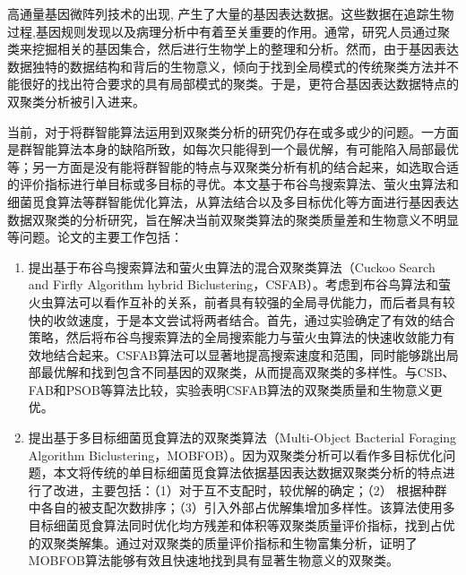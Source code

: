 \begin{cabstract}
  高通量基因微阵列技术的出现, 产生了大量的基因表达数据。这些数据在追踪生物过程,基因规则发现以及病理分析中有着至关重要的作用。通常，研究人员通过聚类来挖掘相关的基因集合，然后进行生物学上的整理和分析。然而，由于基因表达数据独特的数据结构和背后的生物意义，倾向于找到全局模式的传统聚类方法并不能很好的找出符合要求的具有局部模式的聚类。于是，更符合基因表达数据特点的双聚类分析被引入进来。
  
  当前，对于将群智能算法运用到双聚类分析的研究仍存在或多或少的问题。一方面是群智能算法本身的缺陷所致，如每次只能得到一个最优解，有可能陷入局部最优等；另一方面是没有能将群智能的特点与双聚类分析有机的结合起来，如选取合适的评价指标进行单目标或多目标的寻优。本文基于布谷鸟搜索算法、萤火虫算法和细菌觅食算法等群智能优化算法，从算法结合以及多目标优化等方面进行基因表达数据双聚类的分析研究，旨在解决当前双聚类算法的聚类质量差和生物意义不明显等问题。论文的主要工作包括：

  \begin{enumerate}
    \item 提出基于布谷鸟搜索算法和萤火虫算法的混合双聚类算法（Cuckoo Search and Firfly Algorithm hybrid Biclustering，CSFAB）。考虑到布谷鸟算法和萤火虫算法可以看作互补的关系，前者具有较强的全局寻优能力，而后者具有较快的收敛速度，于是本文尝试将两者结合。首先，通过实验确定了有效的结合策略，然后将布谷鸟搜索算法的全局搜索能力与萤火虫算法的快速收敛能力有效地结合起来。CSFAB算法可以显著地提高搜索速度和范围，同时能够跳出局部最优解和找到包含不同基因的双聚类，从而提高双聚类的多样性。与CSB、FAB和PSOB等算法比较，实验表明CSFAB算法的双聚类质量和生物意义更优。

    \item 提出基于多目标细菌觅食算法的双聚类算法（Multi-Object Bacterial Foraging Algorithm Biclustering，MOBFOB）。因为双聚类分析可以看作多目标优化问题，本文将传统的单目标细菌觅食算法依据基因表达数据双聚类分析的特点进行了改进，主要包括：（1）对于互不支配时，较优解的确定；（2） 根据种群中各自的被支配次数排序；（3）引入外部占优解集增加多样性。该算法使用多目标细菌觅食算法同时优化均方残差和体积等双聚类质量评价指标，找到占优的双聚类解集。通过对双聚类的质量评价指标和生物富集分析，证明了MOBFOB算法能够有效且快速地找到具有显著生物意义的双聚类。
  \end{enumerate}


\end{cabstract}

